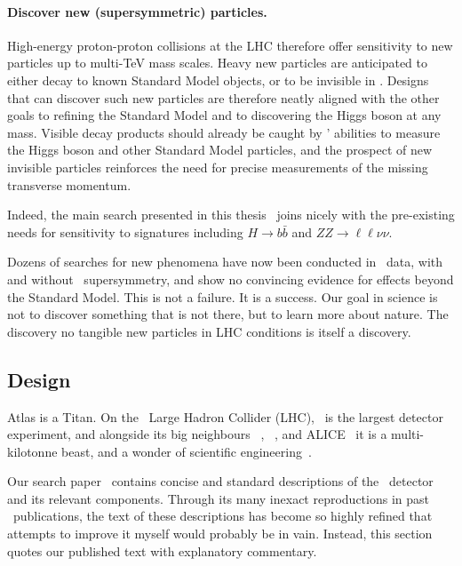 \paragraph{Discover new (supersymmetric) particles.}
High-energy proton-proton collisions at the LHC therefore offer sensitivity
to new particles up to multi-TeV mass scales.
Heavy new particles are anticipated to either decay to known Standard Model
objects, or to be invisible in \atlas.
Designs that can discover such new particles are therefore neatly aligned with
the other goals to refining the Standard Model
and to discovering the Higgs boson at any mass.
Visible decay products should already be caught by \atlas' abilities
to measure the Higgs boson and other Standard Model particles,
and the prospect of new invisible particles reinforces the need for precise
measurements of the missing transverse momentum.

Indeed, the main search presented in this thesis~\cite{atlas2022searches}
joins nicely with the pre-existing needs for sensitivity to signatures
including
$H \to b\bar b$
and
$ZZ \to \ell\ell\nu\nu$.

Dozens of searches for new phenomena have now been conducted in \atlas\ data,
with~\cite{
ATL-PHYS-PUB-2022-013
}
and without~\cite{
ATL-PHYS-PUB-2022-007,
ATL-PHYS-PUB-2022-012,
ATL-PHYS-PUB-2022-036,
ATL-PHYS-PUB-2022-034
} supersymmetry,
and show no convincing evidence for effects beyond the Standard Model.
This is not a failure. It is a success.
Our goal in science is not to discover something that is not there,
but to learn more about nature.
The discovery no tangible new particles in LHC conditions is itself a
discovery.


\subsection{Design}
Atlas is a Titan.
On the \cern\ Large Hadron Collider (LHC), \atlas\ is the largest detector
experiment, and alongside its big neighbours
\cms~\cite{cms2008experiment},
\lhcb~\cite{lhcb2008experiment},
and ALICE~\cite{alice2008experiment}
it is a multi-kilotonne beast,
and a wonder of scientific engineering~\cite{
atlas2008experiment,
atlas1999design1,
atlas1999design2
}.

Our search paper~\cite{atlas2022searches} contains concise and standard
descriptions of the \atlas\ detector and its relevant components.
Through its many inexact reproductions in past \atlas\ publications, the text
of these descriptions has become so highly refined that attempts to improve
it myself would probably be in vain.
Instead, this section quotes our published text with explanatory commentary.


